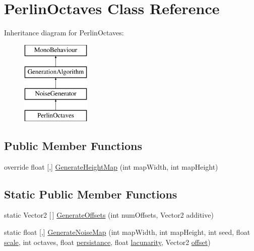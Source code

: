\hypertarget{class_perlin_octaves}{}\section{Perlin\+Octaves Class Reference}
\label{class_perlin_octaves}
Inheritance diagram for Perlin\+Octaves\+:\begin{figure}[H]
\begin{center}
\leavevmode
\includegraphics[height=4.000000cm]{class_perlin_octaves}
\end{center}
\end{figure}
\subsection*{Public Member Functions}
\begin{DoxyCompactItemize}
\item 
override float \mbox{[},\mbox{]} \mbox{\hyperlink{class_perlin_octaves_ac5deb001801dbfe9666df3dea023ce7a}{Generate\+Height\+Map}} (int map\+Width, int map\+Height)
\end{DoxyCompactItemize}
\subsection*{Static Public Member Functions}
\begin{DoxyCompactItemize}
\item 
static Vector2 \mbox{[}$\,$\mbox{]} \mbox{\hyperlink{class_perlin_octaves_a1a9290ee85b1250215cd042223cc7ed9}{Generate\+Offsets}} (int num\+Offsets, Vector2 additive)
\item 
static float \mbox{[},\mbox{]} \mbox{\hyperlink{class_perlin_octaves_acb953d3791014b27123139aee969f9bd}{Generate\+Noise\+Map}} (int map\+Width, int map\+Height, int seed, float \mbox{\hyperlink{class_noise_generator_a411009c00c7e62e99dccd0dd3b98c661}{scale}}, int octaves, float \mbox{\hyperlink{class_perlin_octaves_a0568ba2145fef1efb6bb137df4055a8a}{persistance}}, float \mbox{\hyperlink{class_perlin_octaves_a77574e7d920b80d15916798a4a7900d7}{lacunarity}}, Vector2 \mbox{\hyperlink{class_perlin_octaves_a86b7b4fa2c1f94e01a37748511ddb8ee}{offset}})
\end{DoxyCompactItemize}
